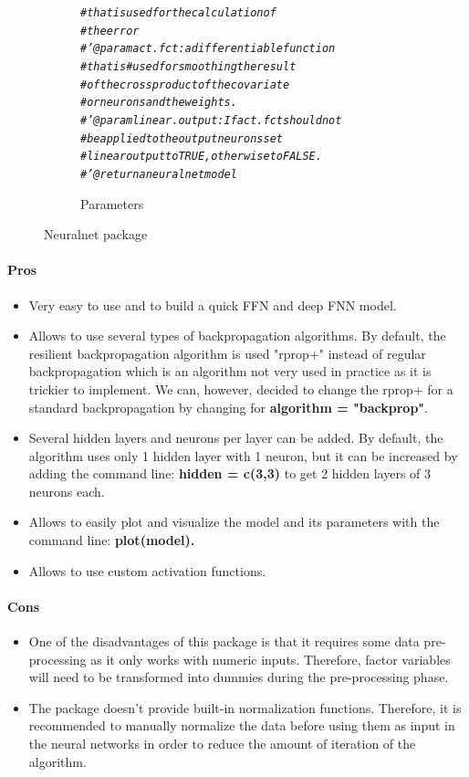 \documentclass[letter,8pt]{article}\usepackage[]{graphicx}\usepackage[]{color}
\makeatletter
\newcommand{\hlcom}[1]{\textcolor[rgb]{0.678,0.584,0.686}{\textit{#1}}}%
\newenvironment{kframe}{%
 \def\at@end@of@kframe{}%
 \ifinner\ifhmode%
  \def\at@end@of@kframe{\end{minipage}}%
  \begin{minipage}{\columnwidth}%
 \fi\fi%
 \def\FrameCommand##1{\hskip\@totalleftmargin \hskip-\fboxsep
 \colorbox{shadecolor}{##1}\hskip-\fboxsep
     \hskip-\linewidth \hskip-\@totalleftmargin \hskip\columnwidth}%
 \MakeFramed {\advance\hsize-\width
   \@totalleftmargin\z@ \linewidth\hsize
   \@setminipage}}%
 {\par\unskip\endMakeFramed%
 \at@end@of@kframe}
\newenvironment{knitrout}{}{} %
\makeatother
\begin{document}
\begin{figure}[H]
\begin{subfigure}{0.5\textwidth}
\begin{knitrout}
\begin{kframe}
\begin{alltt}
\hlcom{#         that is used for the calculation of }
\hlcom{#         the error}
\hlcom{#' @param act.fct : a differentiable function }
\hlcom{#         that is #used for smoothing the result }
\hlcom{#         of the cross product of the covariate }
\hlcom{#         or neurons and the weights.}
\hlcom{#' @param linear.output :  If act.fct should not}
\hlcom{#         be applied to the output neurons set }
\hlcom{#         linear output to TRUE, otherwise to FALSE.}
\hlcom{#' @return a neuralnet model}
\end{alltt}
\end{kframe}
\end{knitrout}
    \caption{Parameters}
  \end{subfigure}
    \caption{Neuralnet package}
\end{figure}


\paragraph{Pros}
\begin{itemize}
\item Very easy to use and to build a quick FFN and deep FNN model.
\item Allows to use several types of backpropagation algorithms. By default, the resilient backpropagation algorithm is used "rprop+" instead of regular backpropagation which is an algorithm not very used in practice as it is trickier to implement. We can, however, decided to change the rprop+ for a standard backpropagation by changing for \textbf{algorithm = "backprop"}.
\item Several hidden layers and neurons per layer can be added. By default, the algorithm uses only 1 hidden layer with 1 neuron, but it can be increased by adding the command line: \textbf{hidden = c(3,3)} to get 2 hidden layers of 3 neurons each.
\item Allows to easily plot and visualize the model and its parameters with the command line: \textbf{plot(model).}
\item Allows to use custom activation functions.
\end{itemize}
\paragraph{Cons}
\begin{itemize}
\item One of the disadvantages of this package is that it requires some data pre-processing as it only works with numeric inputs. Therefore, factor variables will need to be transformed into dummies during the pre-processing phase. 
\item The package doesn't provide built-in normalization functions. Therefore, it is recommended to manually normalize the data before using them as input in the neural networks in order to reduce the amount of iteration of the algorithm.
\end{itemize}
\end{document}
